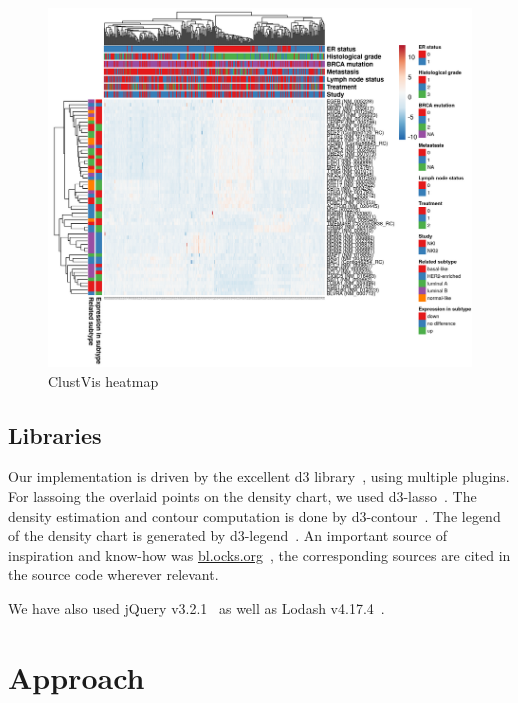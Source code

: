 \documentclass{vgtc} %
\begin{document}
\begin{figure}[bt]
    \centering
    \includegraphics[width=\columnwidth]{clustvis-heat}
    \caption{ClustVis heatmap}
    \label{fig:clustvis-heatmap}
\end{figure}

\subsection{Libraries}

Our implementation is driven by the excellent d3 library~\cite{d3}, using
multiple plugins. For lassoing the overlaid points on the density chart, we
used d3-lasso~\cite{d3-lasso}. The density estimation and contour computation
is done by d3-contour~\cite{d3-contour}. The legend of the density chart is
generated by d3-legend~\cite{d3-legend}. An important source of inspiration and
know-how was \url{bl.ocks.org}~\cite{blocks}, the corresponding sources are
cited in the source code wherever relevant.

We have also used jQuery v3.2.1~\cite{jquery} as well as Lodash
v4.17.4~\cite{lodash}.

\section{Approach} %
\end{document}
